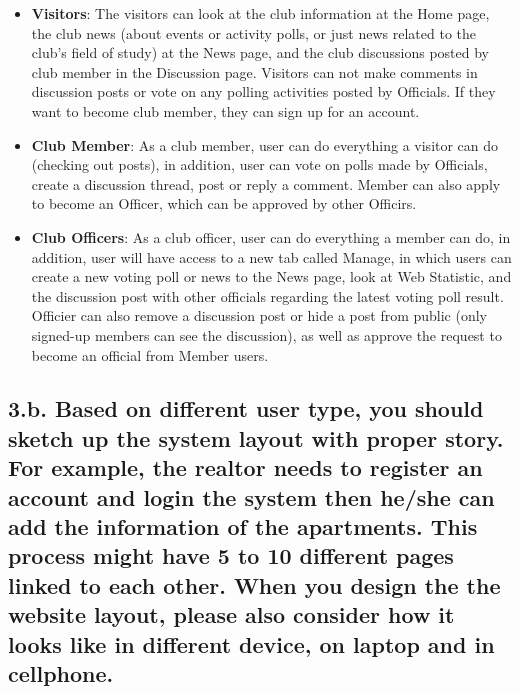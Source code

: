 \documentclass{article}
\begin{document}
\begin{itemize}
    \item \textbf{Visitors}: The visitors can look at the club information at the Home page, the club news (about events or activity polls, or just news related to the club's field of study) at the News page, and the club discussions posted by club member in the Discussion page. Visitors can not make comments in discussion posts or vote on any polling activities posted by Officials. If they want to become club member, they can sign up for an account.
    \item \textbf{Club Member}: As a club member, user can do everything a visitor can do (checking out posts), in addition, user can vote on polls made by Officials, create a discussion thread, post or reply a comment. Member can also apply to become an Officer, which can be approved by other Officirs.
    \item \textbf{Club Officers}: As a club officer, user can do everything a member can do, in addition, user will have access to a new tab called Manage, in which users can create a new voting poll or news to the News page, look at Web Statistic, and the discussion post with other officials regarding the latest voting poll result. Officier can also remove a discussion post or hide a post from public (only signed-up members can see the discussion), as well as approve the request to become an official from Member users.
\end{itemize}



\subsection{  3.b. Based on different user type, you should sketch up the system layout with proper story. For example, the realtor needs to register an account and login the system then he/she can add the information of the apartments. This process might have 5 to 10 different pages linked to each other. When you design the the website layout, please also consider how it looks like in different device, on laptop and in cellphone.}
  
  
  
\end{document}
